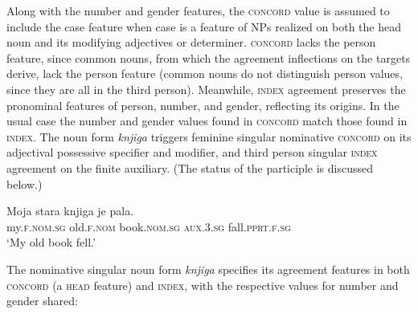 \documentclass[output=paper
 	        ,biblatex
                ,babelshorthands
                ,newtxmath
                ,draftmode
                ,colorlinks, citecolor=brown
]{langscibook}
\begin{document}
Along with the number and gender features, the \textsc{concord} value is assumed to include the case feature when case is a feature of NPs  realized on both the head noun and its modifying adjectives or determiner.   \textsc{concord} lacks the person feature, since  common nouns, from which the agreement inflections on the targets derive, lack the person feature (common nouns do not distinguish person values, since they are all in the third person).    Meanwhile, \textsc{index} agreement preserves the pronominal features of person, number, and gender, reflecting its origins.  In the usual case the number and gender values found in \textsc{concord} match those found in \textsc{index}.  The  noun form \textit{knjiga} triggers feminine singular nominative \textsc{concord} on its adjectival possessive specifier and modifier, and third person singular \textsc{index} agreement on the finite auxiliary.  (The status of the participle is discussed below.)  

\begin{exe}
\ex  \label{fell}
\gll 	Moja 	stara	 knjiga	je pala.  \\
my.\textsc{f.nom.sg}  old.\textsc{f.nom} 	book.\textsc{nom.sg} 	\textsc{aux.3.sg}  fall.\textsc{pprt.f.sg} \\
\glt`My old book fell.' \citep[18]{Wechsler+Zlatic:2003}
\end{exe}

\noindent
The nominative singular noun form \emph{knjiga} specifies its agreement features in both \textsc{concord} (a \textsc{head} feature) and \textsc{index}, with the respective values for number and gender shared:
\end{document}
